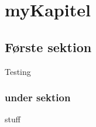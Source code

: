 %
\cfoot{\page\textbackslash \totalp} %
\setcounter{page}{1}
\chapter{myKapitel}

\section{Første sektion}
Testing
\subsection{under sektion}

\cite{HTL}stuff
%